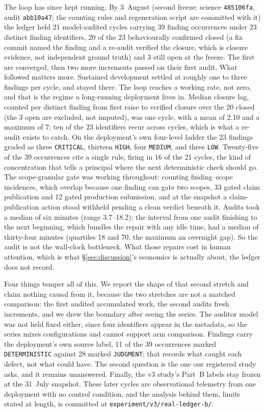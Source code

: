 \documentclass[11pt,letterpaper]{article}
\begin{document}
The loop has since kept running. By 3~August (second freeze: science \texttt{485106fa}, audit \texttt{abb10a47}; the counting rules and regeneration script are committed with it) the ledger held 21 model-audited cycles carrying 39 finding occurrences under 23 distinct finding identifiers, 20 of the 23 behaviourally confirmed closed (a fix commit named the finding and a re-audit verified the closure, which is closure evidence, not independent ground truth) and 3 still open at the freeze. The first arc converged, then two more increments passed on their first audit. What followed matters more. Sustained development settled at roughly one to three findings per cycle, and stayed there. The loop reaches a working rate, not zero, and that is the regime a long-running deployment lives in. Median closure lag, counted per distinct finding from first raise to verified closure over the 20 closed (the 3 open are excluded, not imputed), was one cycle, with a mean of 2.10 and a maximum of 7; ten of the 23 identifiers recur across cycles, which is what a re-audit exists to catch. On the deployment's own four-level ladder the 23 findings graded as three \texttt{CRITICAL}, thirteen \texttt{HIGH}, four \texttt{MEDIUM}, and three \texttt{LOW}. Twenty-five of the 39 occurrences cite a single rule, firing in 16 of the 21 cycles, the kind of concentration that tells a principal where the next deterministic check should go. The scope-granular gate was working throughout: counting finding--scope incidences, which overlap because one finding can gate two scopes, 33 gated claim publication and 12 gated production submission, and at the snapshot a claim-publication action stood withheld pending a clean verdict beneath it. Audits took a median of six minutes (range 3.7--18.2); the interval from one audit finishing to the next beginning, which bundles the repair with any idle time, had a median of thirty-four minutes (quartiles 18 and 70, the maximum an overnight gap). So the audit is not the wall-clock bottleneck. What those repairs cost in human attention, which is what \S\ref{sec:discussion}'s economics is actually about, the ledger does not record.

Four things temper all of this. We report the shape of that second stretch and claim nothing causal from it, because the two stretches are not a matched comparison: the first audited accumulated work, the second audits fresh increments, and we drew the boundary after seeing the series. The auditor model was not held fixed either, since four identifiers appear in the metadata, so the series mixes configurations and cannot support arm comparison. Findings carry the deployment's own source label, 11 of the 39 occurrences marked \texttt{DETERMINISTIC} against 28 marked \texttt{JUDGMENT}; that records what caught each defect, not what could have. The second question is the one our registered study asks, and it remains unanswered. Finally, the v3 study's Part~B labels stay frozen at the 31~July snapshot. These later cycles are observational telemetry from one deployment with no control condition, and the analysis behind them, limits stated at length, is committed at \texttt{experiment/v3/real-ledger-b/}.
\end{document}
